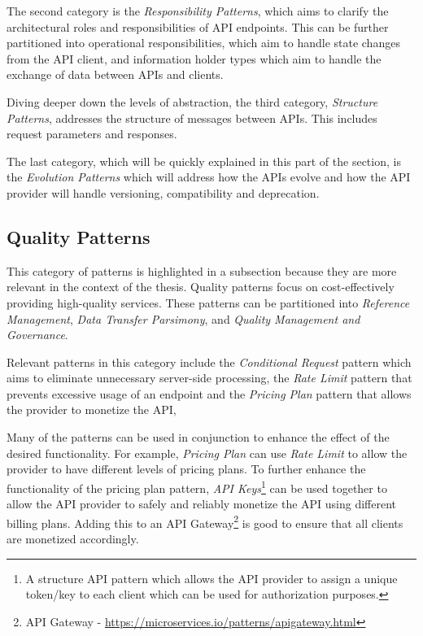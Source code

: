 The second category is the \emph{Responsibility Patterns}, which aims to clarify the architectural roles and responsibilities of API endpoints.
This can be further partitioned into operational responsibilities, which aim to handle state changes from the API client, and information holder types which aim to handle the exchange of data between APIs and clients.

Diving deeper down the levels of abstraction, the third category, \emph{Structure Patterns}, addresses the structure of messages between APIs. This includes request parameters and responses.

The last category, which will be quickly explained in this part of the section, is the \emph{Evolution Patterns} which will address how the APIs evolve and how the API provider will handle versioning, compatibility and deprecation.

\subsection{Quality Patterns}
This category of patterns is highlighted in a subsection because they are more relevant in the context of the thesis. 
Quality patterns focus on cost-effectively providing high-quality services. These patterns can be partitioned into \emph{Reference Management}, \emph{Data Transfer Parsimony}, and \emph{Quality Management and Governance}.

Relevant patterns in this category include the \emph{Conditional Request} pattern which aims to eliminate unnecessary server-side 
processing, the \emph{Rate Limit} pattern that prevents excessive usage of an endpoint and the \emph{Pricing Plan} pattern that allows the provider to monetize the API,

Many of the patterns can be used in conjunction to enhance the effect of the desired functionality. For example, \emph{Pricing Plan} can use \emph{Rate Limit} to allow the provider to have different levels of pricing plans.
To further enhance the functionality of the pricing plan pattern, \emph{API Keys}\footnote{A structure API pattern which allows the API provider
to assign a unique token/key to each client which can be used for authorization purposes.} can be used together to allow the API provider to safely and reliably monetize the API using different billing plans. 
Adding this to an API Gateway\footnote{API Gateway - \url{https://microservices.io/patterns/apigateway.html}} is good to ensure that all clients are monetized accordingly.

